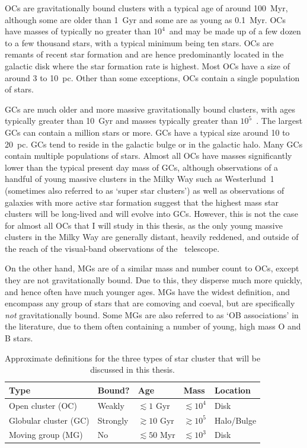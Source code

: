 OCs are gravitationally bound clusters with a typical age of around 100~Myr, although some are older than 1~Gyr and some are as young as 0.1~Myr. OCs have masses of typically no greater than $10^4$~\MSun and may be made up of a few dozen to a few thousand stars, with a typical minimum being ten stars. OCs are remants of recent star formation and are hence predominantly located in the galactic disk where the star formation rate is highest. Most OCs have a size of around 3 to 10~pc. Other than some exceptions, OCs contain a single population of stars. 

GCs are much older and more massive gravitationally bound clusters, with ages typically greater than 10~Gyr and masses typically greater than $10^5$~\MSun. The largest GCs can contain a million stars or more. GCs have a typical size around 10 to 20~pc. GCs tend to reside in the galactic bulge or in the galactic halo. Many GCs contain multiple populations of stars. Almost all OCs have masses significantly lower than the typical present day mass of GCs, although observations of a handful of young massive clusters in the Milky Way such as Westerlund~1 (sometimes also referred to as `super star clusters') as well as observations of galaxies with more active star formation suggest that the highest mass star clusters will be long-lived and will evolve into GCs. However, this is not the case for almost all OCs that I will study in this thesis, as the only young massive clusters in the Milky Way are generally distant, heavily reddened, and outside of the reach of the visual-band observations of the \gaia\ telescope.

On the other hand, MGs are of a similar mass and number count to OCs, except they are not gravitationally bound. Due to this, they disperse much more quickly, and hence often have much younger ages. MGs have the widest definition, and encompass any group of stars that are comoving and coeval, but are specifically \emph{not} gravitationally bound. Some MGs are also referred to as `OB associations' in the literature, due to them often containing a number of young, high mass O and B stars. 

\begin{table}[tb]
	\begin{tabularx}{\textwidth}{l | X | X | X | X}
		\hline\hline
		Type & Bound? & Age & Mass & Location \\
		\hline
		Open cluster (OC)   & Weakly & $\lesssim 1$ Gyr & $\lesssim 10^4$ \MSun & Disk \\
		Globular cluster (GC)   & Strongly & $\gtrsim 10$ Gyr & $\gtrsim 10^5$ \MSun & Halo/Bulge \\
		Moving group (MG)   & No & $\lesssim 50$ Myr & $\lesssim 10^3$ \MSun & Disk\\
		\hline
	\end{tabularx}
	\caption{Approximate definitions for the three types of star cluster that will be discussed in this thesis.\label{tab:intro:definition:definition}}
\end{table}

